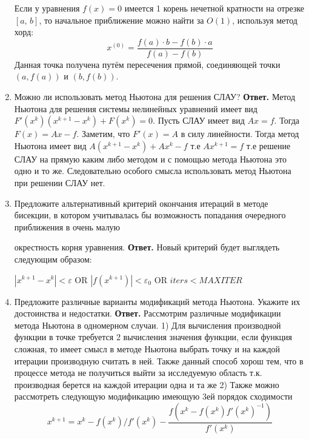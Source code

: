 \documentclass{article}
\begin{document}
\begin{enumerate}
        Если у уравнения $f(x) = 0$ имеется 1 корень нечетной кратности на отрезке $[a,\,b]$, то 
        начальное приближение можно найти за $O(1)$, используя метод хорд:
        \begin{equation*}
            x^{(0)} = \frac{f(a) \cdot b - f(b) \cdot a}{f(a) - f(b)}
        \end{equation*} 
        Данная точка получена путём пересечения прямой, соединяющей точки $(a, f(a))$ и $(b, f(b))$.
        \item Можно ли использовать метод Ньютона для решения
        СЛАУ?
        \newline 
        {\bfseries Ответ. } 
        Метод Ньютона для решения системы нелинейных уравнений имеет вид $F'(x^k)(x^{k+1}-x^k)+F(x^k)=0$. Пусть СЛАУ имеет вид $Ax = f$. Тогда $F(x)=Ax-f$. Заметим, что $F'(x) = A$ в силу линейности. Тогда метод Ньютона имеет вид $A(x^{k+1}-x^k) + Ax^k-f$ т.е $Ax^{k+1}=f$ т.е решение СЛАУ на прямую каким либо методом и с помощью метода Ньютона это одно и то же. Следовательно особого смысла использовать метод Ньютона при решении СЛАУ нет.
        \item Предложите альтернативный критерий окончания итераций в методе 
        бисекции, в котором учитывалась бы 
        возможность попадания очередного приближения в очень малую
        
        окрестность корня уравнения.
        \newline 
        {\bfseries Ответ. } 
        Новый критерий будет выглядеть следующим образом: 
        
            $|x^{k+1} - x^k| < \varepsilon$ {\ttfamily OR } $|f(x^{k+1})| < \varepsilon_0$ {\ttfamily OR } $iters < MAXITER$
        
        \item Предложите различные варианты модификаций метода
        Ньютона. Укажите их достоинства и недостатки.
        \newline 
        {\bfseries Ответ. } 
        Рассмотрим различные модификации метода Ньютона в одномерном случаи.
	1) Для вычисления производной функции в точке требуется 2 вычисления значения функции, если функция сложная, то имеет смысл в методе Ньютона выбрать точку и на каждой итерации производную считать в ней. Также данный способ хорош тем, что в процессе метода не получиться выйти за исследуемую область т.к. производная берется на каждой итерации одна и та же
	2) Также можно рассмотреть следующую модификацию имеющую 3ей порядок сходимости 
	\[
	x^{k+1} = x^k - f(x^k)/f'(x^k)- \frac{f(x^k-f(x^k)f'(x^k)^{-1})}{f'(x^k)}
	\]
	

\end{enumerate}
\end{document}
